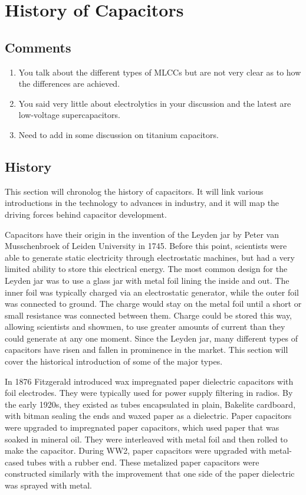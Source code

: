 \section {History of Capacitors}

\subsection{Comments}
\begin{enumerate}
    \item You talk about the different types of MLCCs but are not very clear as to how the differences are achieved.
    \item You said very little about electrolytics in your discussion and the latest are low-voltage supercapacitors.
    \item Need to add in some discussion on titanium capacitors.
\end{enumerate}

\subsection{History}
This section will chronolog the history of capacitors. It will link various introductions in the technology to advances in industry, and it will map the driving forces behind capacitor development.

Capacitors have their origin in the invention of the Leyden jar by Peter van Musschenbroek of Leiden University in 1745.\cite{empLight} Before this point, scientists were able to generate static electricity through electrostatic machines, but had a very limited ability to store this electrical energy. 
\cite{ieee_hist} 
The most common design for the Leyden jar was to use a glass jar with metal foil lining the inside and out. The inner foil was typically charged via an electrostatic generator, while the outer foil was connected to ground. The charge would stay on the metal foil until a short or small resistance was connected between them. Charge could be stored this way, allowing scientists and showmen, to use greater amounts of current than they could generate at any one moment.
Since the Leyden jar, many different types of capacitors have risen and fallen in prominence in the market. This section will cover the historical introduction of some of the major types.

In 1876 Fitzgerald introduced wax impregnated paper dielectric capacitors with foil electrodes.\cite[ch.~11]{dumInv}\cite{learn_caps} They were typically used for power supply filtering in radios. By the early 1920s, they existed as tubes encapsulated in plain, Bakelite cardboard, with bitman sealing the ends and waxed paper as a dielectric.\cite[ch~3]{dumInv}
Paper capacitors were upgraded to impregnated paper capacitors, which used paper that was soaked in mineral oil. They were interleaved with metal foil and then rolled to make the capacitor.\cite[ch.~8.2.1.1]{poorIntro} During WW2, paper capacitors were upgraded with metal-cased tubes with a rubber end.\cite[ch.~8.1]{poorIntro} These metalized paper capacitors were constructed similarly with the improvement that one side of the paper dielectric was sprayed with metal.\cite{hist_cerFilt}

